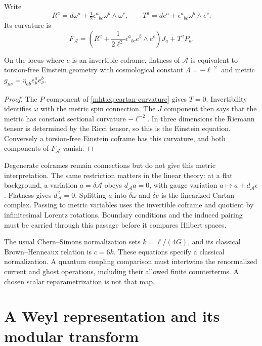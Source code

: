 Write
\[
 R^a=d\omega^a+\tfrac12\epsilon^a{}_{bc}\omega^b\wedge\omega^c,
 \qquad
 T^a=de^a+\epsilon^a{}_{bc}\omega^b\wedge e^c.
\]
Its curvature is
\begin{equation}\label{mht:eq:cartan-curvature}
 F_{\mathcal A}
 =\left(R^a+\frac1{2\ell^2}
                  \epsilon^a{}_{bc}e^b\wedge e^c\right)J_a+T^aP_a.
\end{equation}

\begin{proposition}\label{mht:prop:cartan-invertible}
On the locus where $e$ is an invertible coframe, flatness of
$\mathcal A$ is equivalent to torsion-free Einstein geometry with
cosmological constant $\Lambda=-\ell^{-2}$ and metric
$g_{\mu\nu}=\eta_{ab}e^a_\mu e^b_\nu$.
\end{proposition}

\begin{proof}
The $P$ component of \eqref{mht:eq:cartan-curvature} gives $T=0$.
Invertibility identifies $\omega$ with the metric spin connection.
The $J$ component then says that the metric has constant sectional
curvature $-\ell^{-2}$. In three dimensions the Riemann tensor is
determined by the Ricci tensor, so this is the Einstein equation.
Conversely a torsion-free Einstein coframe has this curvature, and
both components of $F_{\mathcal A}$ vanish.
\end{proof}

Degenerate coframes remain connections but do not give this metric
interpretation. The same restriction matters in the linear theory:
at a flat background, a variation $a=\delta\mathcal A$ obeys
$d_{\mathcal A}a=0$, with gauge variation
$a\mapsto a+d_{\mathcal A}\epsilon$. Flatness gives
$d_{\mathcal A}^2=0$. Splitting $a$ into $\delta\omega$ and $\delta e$
is the linearized Cartan complex. Passing to metric variables uses
the invertible coframe and quotient by infinitesimal Lorentz rotations.
Boundary conditions and the induced pairing must be carried through
this passage before it compares Hilbert spaces.

The usual Chern--Simons normalization sets $k=\ell/(4G)$, and its
classical Brown--Henneaux relation is $c=6k$. These equations specify
a classical normalization. A quantum coupling comparison must
intertwine the renormalized current and ghost operations, including
their allowed finite counterterms. A chosen scalar reparametrization
is not that map.

\section{A Weyl representation and its modular transform}

